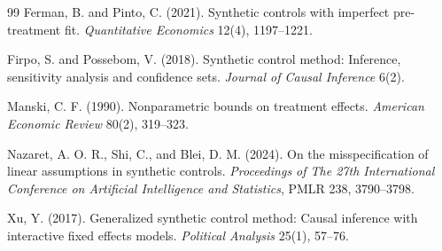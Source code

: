 \documentclass[11pt]{article}
\theoremstyle{definition}
\theoremstyle{plain}
\theoremstyle{remark}
\begin{document}
\begin{thebibliography}{99}
Ferman, B. and Pinto, C. (2021).
Synthetic controls with imperfect pre-treatment fit.
\emph{Quantitative Economics} 12(4), 1197--1221.

Firpo, S. and Possebom, V. (2018).
Synthetic control method: Inference, sensitivity analysis and confidence sets.
\emph{Journal of Causal Inference} 6(2).

Manski, C. F. (1990).
Nonparametric bounds on treatment effects.
\emph{American Economic Review} 80(2), 319--323.

Nazaret, A. O. R., Shi, C., and Blei, D. M. (2024).
On the misspecification of linear assumptions in synthetic controls.
\emph{Proceedings of The 27th International Conference on Artificial Intelligence and Statistics}, PMLR 238, 3790--3798.

Xu, Y. (2017).
Generalized synthetic control method: Causal inference with interactive fixed effects models.
\emph{Political Analysis} 25(1), 57--76.
\end{thebibliography}
\end{document}
